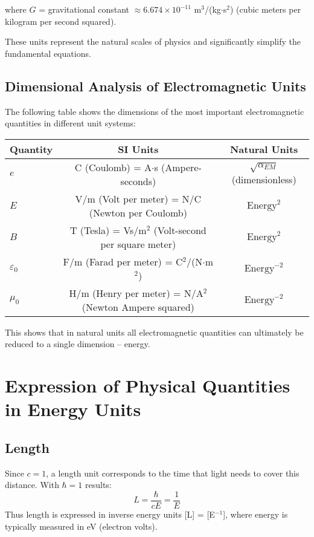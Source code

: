 \documentclass[12pt,a4paper]{article}
\begin{document}
	where $G$ = gravitational constant $\approx 6.674 \times 10^{-11}$ m$^3$/(kg$\cdot$s$^2$) (cubic meters per kilogram per second squared).
	
	These units represent the natural scales of physics and significantly simplify the fundamental equations.
	
	\subsection{Dimensional Analysis of Electromagnetic Units}
	
	The following table shows the dimensions of the most important electromagnetic quantities in different unit systems:
	
	\begin{center}
		\begin{tabular}{|l|c|c|}
			\hline
			\textbf{Quantity} & \textbf{SI Units} & \textbf{Natural Units}\\
			\hline
			$e$ & C (Coulomb) = A$\cdot$s (Ampere-seconds) & $\sqrt{\alpha_{EM}}$ (dimensionless) \\
			$E$ & V/m (Volt per meter) = N/C (Newton per Coulomb) & $\text{Energy}^2$ \\
			$B$ & T (Tesla) = Vs/m$^2$ (Volt-second per square meter) & $\text{Energy}^2$ \\
			$\varepsilon_0$ & F/m (Farad per meter) = C$^2$/(N$\cdot$m$^2$) & $\text{Energy}^{-2}$ \\
			$\mu_0$ & H/m (Henry per meter) = N/A$^2$ (Newton Ampere squared) & $\text{Energy}^{-2}$ \\
			\hline
		\end{tabular}
	\end{center}
	
	This shows that in natural units all electromagnetic quantities can ultimately be reduced to a single dimension – energy.
	
	\section{Expression of Physical Quantities in Energy Units}
	
	\subsection{Length}
	Since $c=1$, a length unit corresponds to the time that light needs to cover this distance. With $\hbar=1$ results:
	\begin{equation}
		L = \frac{\hbar}{cE} = \frac{1}{E}
	\end{equation}
	Thus length is expressed in inverse energy units [L] = [E$^{-1}$], where energy is typically measured in eV (electron volts).
	
\end{document}
